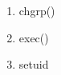 \documentclass[11pt,letterpaper]{report}
\begin{document}
\begin{enumerate}
\begin{enumerate}
                                                                                                                                                                                                                                                                                                                                                                                                                                                                                                                                                                            \item chgrp()
                                                                                                                                                                                                                                                                                                                                                                                                                                                                                                                                                                                    \item exec()
                                                                                                                                                                                                                                                                                                                                                                                                                                                                                                                                                                                            \item setuid
                                                                                                                                                                                                                                                                                                                                                                                                                                                                                                                                                                                                \end{enumerate}


\end{enumerate}
\end{document}
